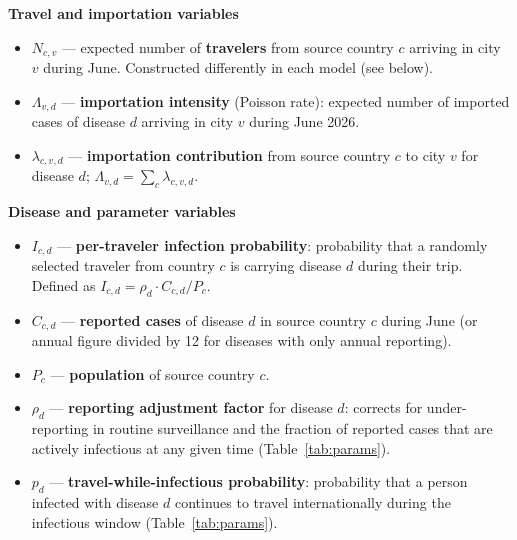 \documentclass[12pt]{article}
\begin{document}
\vspace{0.5em}
\noindent\textbf{Travel and importation variables}
\begin{itemize}
  \item $N_{c,v}$ --- expected number of \textbf{travelers} from
    source country $c$ arriving in city $v$ during June.
    Constructed differently in each model (see below).
  \item $\Lambda_{v,d}$ --- \textbf{importation intensity} (Poisson
    rate): expected number of imported cases of disease $d$ arriving
    in city $v$ during June 2026.
  \item $\lambda_{c,v,d}$ --- \textbf{importation contribution}
    from source country $c$ to city $v$ for disease $d$;
    $\Lambda_{v,d} = \sum_c \lambda_{c,v,d}$.
\end{itemize}

\vspace{0.5em}
\noindent\textbf{Disease and parameter variables}
\begin{itemize}
  \item $I_{c,d}$ --- \textbf{per-traveler infection probability}:
    probability that a randomly selected traveler from country $c$
    is carrying disease $d$ during their trip. Defined as
    $I_{c,d} = \rho_d \cdot C_{c,d} / P_c$.
  \item $C_{c,d}$ --- \textbf{reported cases} of disease $d$ in
    source country $c$ during June (or annual figure divided by 12 for
    diseases with only annual reporting).
  \item $P_c$ --- \textbf{population} of source country $c$.
  \item $\rho_d$ --- \textbf{reporting adjustment factor} for
    disease $d$: corrects for under-reporting in routine
    surveillance and the fraction of reported cases that are
    actively infectious at any given time
    (Table~\ref{tab:params}).
  \item $p_d$ --- \textbf{travel-while-infectious probability}:
    probability that a person infected with disease $d$ continues
    to travel internationally during the infectious window
    (Table~\ref{tab:params}).
\end{itemize}
\end{document}
